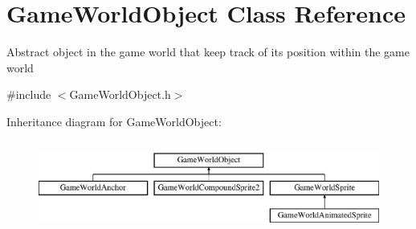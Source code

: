 \hypertarget{class_game_world_object}{}\section{Game\+World\+Object Class Reference}
\label{class_game_world_object}


Abstract object in the game world that keep track of its position within the game world  




{\ttfamily \#include $<$Game\+World\+Object.\+h$>$}

Inheritance diagram for Game\+World\+Object\+:\begin{figure}[H]
\begin{center}
\leavevmode
\includegraphics[height=3.000000cm]{class_game_world_object}
\end{center}
\end{figure}

